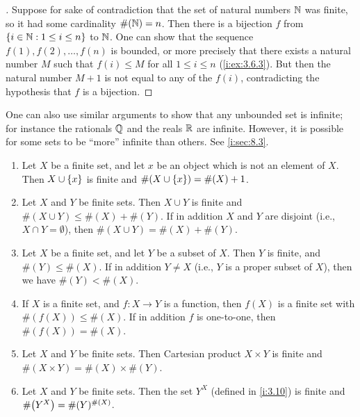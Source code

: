 \begin{proof}[]
  Suppose for sake of contradiction that the set of natural numbers \(\mathbb{N}\) was finite, so it had some cardinality \(\#(\mathbb{N}) = n\).
  Then there is a bijection \(f\) from \(\left\lbrace i \in \mathbb{N} : 1 \leq i \leq n\right\rbrace\) to \(\mathbb{N}\).
  One can show that the sequence \(f(1), f(2), \dots, f(n)\) is bounded, or more precisely that there exists a natural number \(M\) such that \(f(i) \leq M\) for all \(1 \leq i \leq n\) (\cref{i:ex:3.6.3}).
  But then the natural number \(M+1\) is not equal to any of the \(f(i)\), contradicting the hypothesis that \(f\) is a bijection.
\end{proof}

\begin{rmk}\label{i:3.6.13}
  One can also use similar arguments to show that any unbounded set is infinite;
  for instance the rationals \(\mathbb{Q}\) and the reals \(\mathbb{R}\) are infinite.
  However, it is possible for some sets to be ``more'' infinite than others.
  See \cref{i:sec:8.3}.
\end{rmk}

\begin{prop}\label{i:3.6.14}
  \begin{enumerate}
    \item Let \(X\) be a finite set, and let \(x\) be an object which is not an element of \(X\).
          Then \(X \cup \left\lbrace x\right\rbrace\) is finite and \(\#(X \cup \left\lbrace x\right\rbrace) = \#(X) + 1\).
    \item Let \(X\) and \(Y\) be finite sets.
          Then \(X \cup Y\) is finite and \(\#(X \cup Y) \leq \#(X) + \#(Y)\).
          If in addition \(X\) and \(Y\) are disjoint (i.e., \(X \cap Y = \emptyset\)), then \(\#(X \cup Y) = \#(X) + \#(Y)\).
    \item Let \(X\) be a finite set, and let \(Y\) be a subset of \(X\).
          Then \(Y\) is finite, and \(\#(Y) \leq \#(X)\).
          If in addition \(Y \neq X\) (i.e., \(Y\) is a proper subset of \(X\)), then we have \(\#(Y) < \#(X)\).
    \item If \(X\) is a finite set, and \(f : X \to Y\) is a function, then \(f(X)\) is a finite set with \(\#(f(X)) \leq \#(X)\).
          If in addition \(f\) is one-to-one, then \(\#(f(X)) = \#(X)\).
    \item Let \(X\) and \(Y\) be finite sets.
          Then Cartesian product \(X \times Y\) is finite and \(\#(X \times Y) = \#(X) \times \#(Y)\).
    \item Let \(X\) and \(Y\) be finite sets.
          Then the set \(Y^X\) (defined in \cref{i:3.10}) is finite and \(\#\pa{Y^X} = \#(Y)^{\#(X)}\).
  \end{enumerate}
\end{prop}

